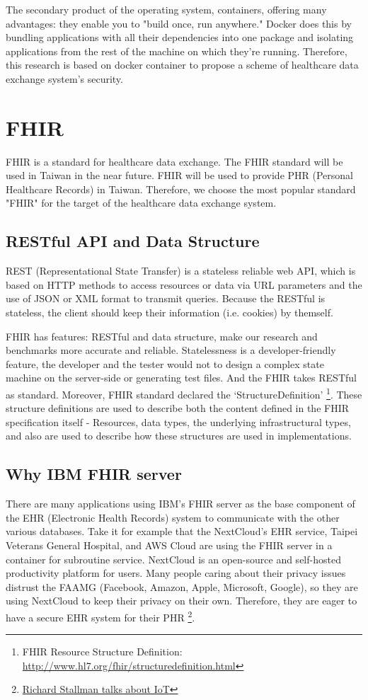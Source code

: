 The secondary product of the operating system, containers, offering many advantages:
they enable you to "build once, run anywhere." Docker does this by bundling
applications with all their dependencies into one package and isolating applications
from the rest of the machine on which they're running. Therefore, this research
is based on docker container to propose a scheme of healthcare data exchange system's
security.

\section{FHIR}
FHIR is a standard for healthcare data exchange. The FHIR standard will be used in
Taiwan in the near future. FHIR will be used to provide PHR (Personal Healthcare Records)
in Taiwan. Therefore, we choose the most popular standard "FHIR" for the target of
the healthcare data exchange system.

\subsection{RESTful API and Data Structure}
REST (Representational State Transfer) is a stateless reliable web API, which is based
on HTTP methods to access resources or data via URL parameters and the use of JSON or
XML format to transmit queries. Because the RESTful is stateless, the client should
keep their information (i.e. cookies) by themself.

FHIR has features: RESTful and data structure, make our research and benchmarks more accurate
and reliable.
Statelessness is a developer-friendly feature, the developer and the tester would not
to design a complex state machine on the server-side or generating test files. And the FHIR
takes RESTful as standard. Moreover, FHIR standard declared the `StructureDefinition'
\footnote{FHIR Resource Structure Definition: \url{http://www.hl7.org/fhir/structuredefinition.html}}.
These structure definitions are used to describe both the content defined in the FHIR
specification itself - Resources, data types, the underlying infrastructural types, and
also are used to describe how these structures are used in implementations.

\subsection{Why IBM FHIR server}
There are many applications using IBM's FHIR server as the base component of the EHR
(Electronic Health Records) system to communicate with the other various databases.
Take it for example that the NextCloud's EHR service, Taipei Veterans General Hospital,
and AWS Cloud are using the FHIR server in a container for subroutine service.
NextCloud is an open-source and self-hosted productivity platform for users.
Many people caring about their privacy issues distrust the FAAMG (Facebook,
Amazon, Apple, Microsoft, Google), so they are using NextCloud to keep their privacy
on their own. Therefore, they are eager to have a secure EHR system for their
PHR
\footnote{\href{https://www.youtube.com/watch?v=AAP4N3KyLmM}{Richard Stallman talks about IoT}}.

